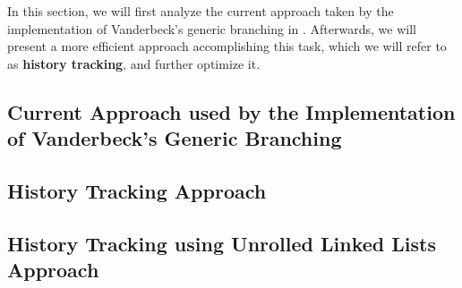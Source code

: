 In this section, we will first analyze the current approach taken by the implementation of Vanderbeck's generic branching in \GCG{}. Afterwards, we will present a more efficient approach accomplishing this task, which we will refer to as \textbf{history tracking}, and further optimize it.

\subsection{Current Approach used by the Implementation of Vanderbeck's Generic Branching}\label{subsec:gm_sync_current}



\subsection{History Tracking Approach}\label{subsec:gm_sync_history}
\subsection{History Tracking  using Unrolled Linked Lists Approach}\label{subsec:gm_sync_history_unrolled}